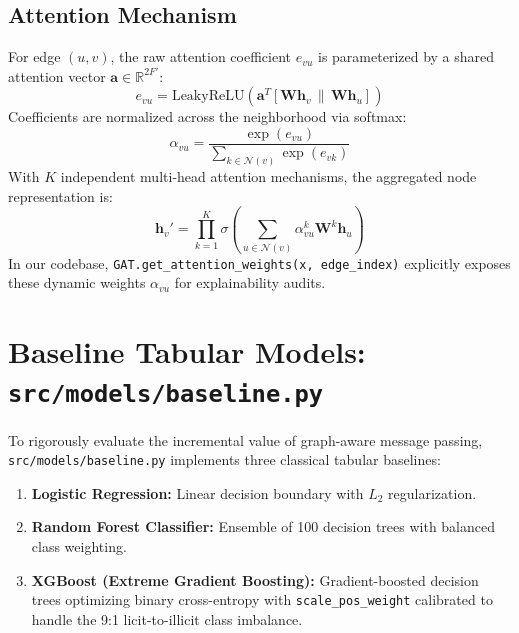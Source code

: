 \documentclass[11pt,a4paper]{report}
\begin{document}
\subsection{Attention Mechanism}
For edge $(u, v)$, the raw attention coefficient $e_{vu}$ is parameterized by a shared attention vector $\mathbf{a} \in \mathbb{R}^{2 F'}$:
\[
e_{vu} = \text{LeakyReLU} \left( \mathbf{a}^T \left[ \mathbf{W} \mathbf{h}_v \,\|\, \mathbf{W} \mathbf{h}_u \right] \right)
\]
Coefficients are normalized across the neighborhood via softmax:
\[
\alpha_{vu} = \frac{\exp(e_{vu})}{\sum_{k \in \mathcal{N}(v)} \exp(e_{vk})}
\]
With $K$ independent multi-head attention mechanisms, the aggregated node representation is:
\[
\mathbf{h}_v' = \prod_{k=1}^K \sigma \left( \sum_{u \in \mathcal{N}(v)} \alpha_{vu}^k \mathbf{W}^k \mathbf{h}_u \right)
\]
In our codebase, \texttt{GAT.get\_attention\_weights(x, edge\_index)} explicitly exposes these dynamic weights $\alpha_{vu}$ for explainability audits.

\section{Baseline Tabular Models: \texttt{src/models/baseline.py}}
To rigorously evaluate the incremental value of graph-aware message passing, \texttt{src/models/baseline.py} implements three classical tabular baselines:
\begin{enumerate}[leftmargin=1.5em]
  \item \textbf{Logistic Regression:} Linear decision boundary with $L_2$ regularization.
  \item \textbf{Random Forest Classifier:} Ensemble of 100 decision trees with balanced class weighting.
  \item \textbf{XGBoost (Extreme Gradient Boosting):} Gradient-boosted decision trees optimizing binary cross-entropy with \texttt{scale\_pos\_weight} calibrated to handle the 9:1 licit-to-illicit class imbalance.
\end{enumerate}
\end{document}
